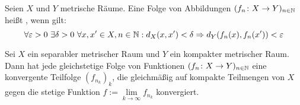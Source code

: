 \begin{definition}[gleichstetig]
\label{def:2.14}
	Seien $X$ und $Y$ metrische Räume.
	Eine Folge von Abbildungen $(f_n\colon X \rightarrow Y)_{n \in \mathbb{N}}$ heißt , wenn gilt:
	\[
		\forall \varepsilon > 0 \ \exists \delta > 0 \ \forall x,x' \in X, n \in \mathbb{N} : d_X(x,x') < \delta \Rightarrow d_Y(f_n(x),f_n(x')) < \varepsilon
	\]
\end{definition}

\begin{lemma}
\label{lemma:2.15}
\label{arzela-ascoli}
	Sei $X$ ein separabler metrischer Raum und $Y$ ein kompakter metrischer Raum. 
	Dann hat jede gleichstetige Folge von Funktionen $(f_n\colon X \rightarrow Y)_{n \in \mathbb{N}}$ eine konvergente Teilfolge $(f_{n_k})_k$, die gleichmäßig auf kompakte Teilmengen von $X$ gegen die stetige Funktion $f := \lim\limits_{k \rightarrow \infty} f_{n_k}$ konvergiert.
\end{lemma}

